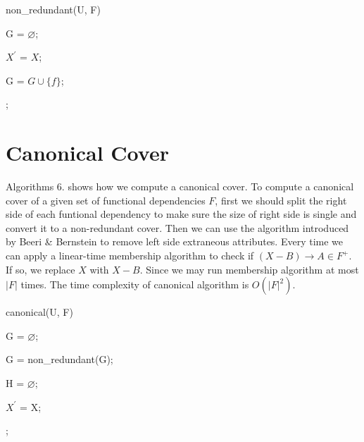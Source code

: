 \documentclass[11pt]{book}
\begin{document}
\begin{algorithm}

  \caption{non\_redundant(U, F)}
  
  \SetAlgoLined
  
  G = $\varnothing$;
  
   {
    $X^{'}$ = $X$;
    
     {
    	G = $G \cup \{ f \}$;
    }
  }
  
  ;

\end{algorithm}

\section{Canonical Cover}

Algorithms 6. shows how we compute a canonical cover. To compute a canonical cover of a given set of functional dependencies $F$, first we should split the right side of each funtional dependency to make sure the size of right side is single and convert it to a non-redundant cover. Then we can use the algorithm introduced by Beeri \& Bernstein \cite{beeri1979computational} to remove left side extraneous attributes. Every time we can apply a linear-time membership algorithm to check if $(X - {B}) \to A \in F^{+}$. If so, we replace $X$ with $X - {B}$. Since we may run membership algorithm at most $|F|$ times. The time complexity of canonical algorithm is $O(|F|^2)$.

\begin{algorithm}

  \caption{canonical(U, F)}
  
  \SetAlgoLined
  
  G = $\varnothing$;

   {
  }
  
  G = non\_redundant(G);
  
  H = $\varnothing$;
  
   {
    $X^{'}$ = X;
     	
  }
  
  ;
  
\end{algorithm}
\end{document}
